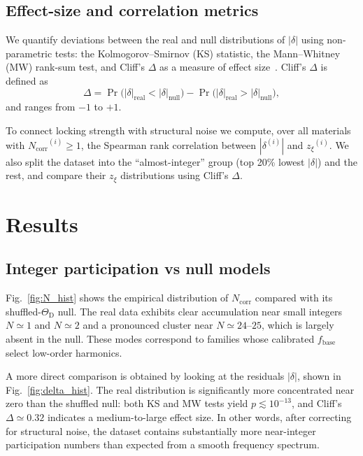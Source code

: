\documentclass[aps,prb,twocolumn,superscriptaddress,floatfix,nofootinbib]{revtex4-2}
\newcommand{\ThetaD}{\ensuremath{\Theta_{\mathrm{D}}}}
\newcommand{\fbase}{\ensuremath{{f_{\mathrm{base}}}}}
\newcommand{\Ncorr}{\ensuremath{{N_{\mathrm{corr}}}}}
\newcommand{\deltalock}{\ensuremath{\delta}}
\newcommand{\znoise}{\ensuremath{{z_{\xi}}}}
\newcommand{\figref}[1]{Fig.~\ref{#1}}
\begin{document}
\subsection{Effect-size and correlation metrics}

We quantify deviations between the real and null distributions of
$|\deltalock|$ using non-parametric tests:
the Kolmogorov--Smirnov (KS) statistic,
the Mann--Whitney (MW) rank-sum test,
and Cliff's $\Delta$ as a measure of effect size~\cite{Cliff1993}.
Cliff's $\Delta$ is defined as
\begin{equation}
  \Delta =
  \Pr\bigl(|\deltalock|_{\mathrm{real}} <
           |\deltalock|_{\mathrm{null}}\bigr)
  - \Pr\bigl(|\deltalock|_{\mathrm{real}} >
             |\deltalock|_{\mathrm{null}}\bigr),
\end{equation}
and ranges from $-1$ to $+1$.

To connect locking strength with structural noise we compute,
over all materials with $\Ncorr^{(i)} \ge 1$,
the Spearman rank correlation between $|\deltalock^{(i)}|$
and $\znoise^{(i)}$.
We also split the dataset into the ``almost-integer'' group
(top 20\% lowest $|\deltalock|$) and the rest,
and compare their $\znoise$ distributions using Cliff's $\Delta$.

\section{Results}
\label{sec:results}

\subsection{Integer participation vs null models}

\figref{fig:N_hist} shows the empirical distribution of
$\Ncorr$ compared with its shuffled-$\ThetaD$ null.
The real data exhibits clear accumulation near small integers
$N \simeq 1$ and $N \simeq 2$ and a pronounced cluster near
$N \simeq 24$--$25$, which is largely absent in the null.
These modes correspond to families whose calibrated $\fbase$
select low-order harmonics.

A more direct comparison is obtained by looking at the residuals
$|\deltalock|$, shown in \figref{fig:delta_hist}.
The real distribution is significantly more concentrated near zero
than the shuffled null:
both KS and MW tests yield $p \lesssim 10^{-13}$,
and Cliff's $\Delta \simeq 0.32$ indicates a medium-to-large effect size.
In other words, after correcting for structural noise,
the dataset contains substantially more near-integer
participation numbers than expected from a smooth frequency spectrum.
\end{document}
